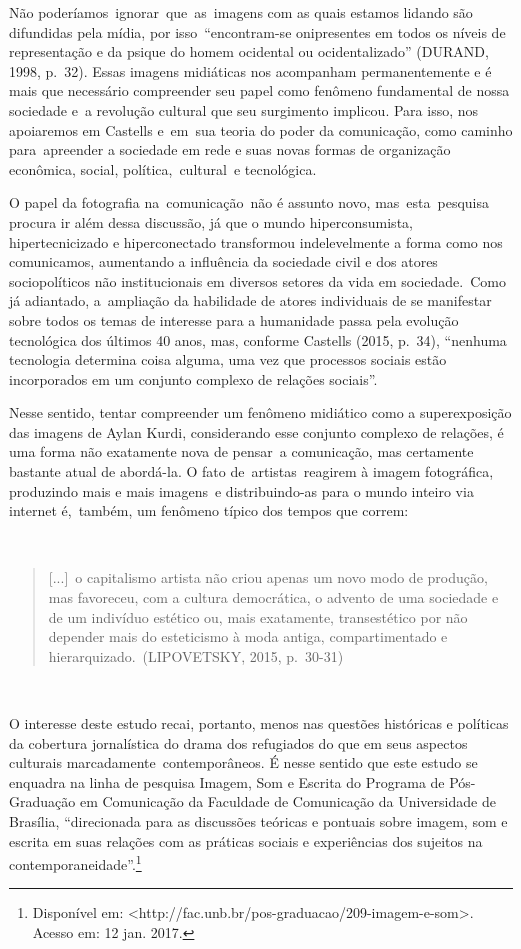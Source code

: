 \documentclass[
  letterpaper,
]{abntex2}
\begin{document}
Não poderíamos~ignorar~que~as~imagens com as quais estamos lidando são
difundidas pela mídia, por isso~``encontram-se onipresentes em todos os
níveis de representação e da psique do homem ocidental ou
ocidentalizado'' (DURAND, 1998, p.~32). Essas imagens midiáticas nos
acompanham permanentemente e é mais que necessário compreender seu papel
como fenômeno fundamental de nossa sociedade e~a revolução cultural que
seu surgimento implicou. Para isso, nos apoiaremos em Castells e~em~sua
teoria do poder da comunicação, como caminho para~apreender a sociedade
em rede e suas novas formas de organização econômica, social,
política,~cultural~e tecnológica.~

O papel da fotografia na~comunicação~não é assunto novo,
mas~esta~pesquisa procura ir além dessa discussão, já que o mundo
hiperconsumista, hipertecnicizado e hiperconectado transformou
indelevelmente a forma como nos comunicamos, aumentando a influência da
sociedade civil e dos atores sociopolíticos não institucionais em
diversos setores da vida em sociedade.~Como já adiantado, a~ampliação da
habilidade de atores individuais de se manifestar sobre todos os temas
de interesse para a humanidade passa pela evolução tecnológica dos
últimos 40 anos, mas, conforme Castells (2015, p.~34), ``nenhuma
tecnologia determina coisa alguma, uma vez que processos sociais estão
incorporados em um conjunto complexo de relações sociais''.

Nesse sentido, tentar compreender um fenômeno midiático como a
superexposição das imagens de Aylan Kurdi, considerando esse conjunto
complexo de relações, é uma forma não exatamente nova de pensar~a
comunicação, mas certamente bastante atual de abordá-la. O fato
de~artistas~reagirem à imagem fotográfica, produzindo mais e mais
imagens~e distribuindo-as para o mundo inteiro via internet é,~também,
um fenômeno típico dos tempos que correm:~

~

\begin{quote}
{[}...{]}~o capitalismo artista não criou apenas um novo modo de
produção, mas favoreceu, com a cultura democrática, o advento de uma
sociedade e de um indivíduo estético ou, mais exatamente, transestético
por não depender mais do esteticismo à moda antiga, compartimentado e
hierarquizado.~(LIPOVETSKY, 2015, p.~30-31)~
\end{quote}

~

O interesse deste estudo recai, portanto, menos nas questões históricas
e políticas da cobertura jornalística do drama dos refugiados do que em
seus aspectos culturais marcadamente~contemporâneos. É nesse sentido que
este estudo se enquadra na linha de pesquisa Imagem, Som e Escrita do
Programa de Pós-Graduação em Comunicação da Faculdade de Comunicação da
Universidade de Brasília, ``direcionada para as discussões teóricas e
pontuais sobre imagem, som e escrita em suas relações com as práticas
sociais e experiências dos sujeitos na contemporaneidade''.\footnote{Disponível
  em:
  \textless http://fac.unb.br/pos-graduacao/209-imagem-e-som\textgreater.
  Acesso em: 12 jan. 2017.}
\end{document}
